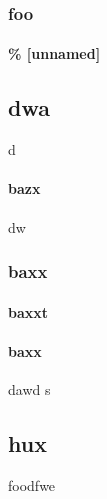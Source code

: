 \documentclass[]{article}
\begin{document}
\section{foo}




\subsection*{\% [unnamed]}



\begin{center}
\part*{dwa}

d




\subsection{bazx} dw




\section{baxx}



\subsection{baxxt}




\end{center}




\subsection{baxx}



dawd
s


\chapter{hux}




foodfwe
\end{document}
